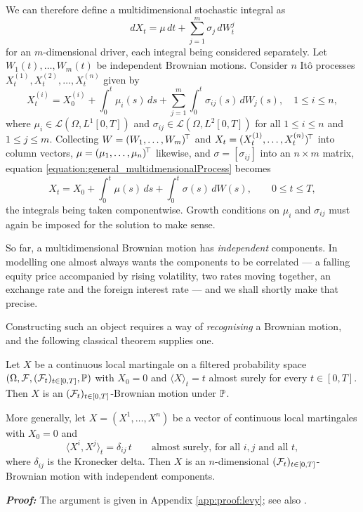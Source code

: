 We can therefore define a multidimensional stochastic integral as
\begin{equation}
    dX_t = \mu \, dt + \sum_{j=1}^{m} \sigma_j \, dW_t^{j}
\end{equation}
for an $m$-dimensional driver, each integral being considered separately. Let
\(W_1(t),\dots,W_m(t)\) be independent Brownian motions. Consider \(n\) Itô processes \(X_t^{(1)}, X_t^{(2)}, \ldots, X_t^{(n)}\) given by
\begin{equation}\label{equation:general_multidmensionalProcess}
X_t^{(i)} = X_0^{(i)} +  \int_0^t \mu_i(s) \, ds +\sum_{j=1}^m \int_0^t \sigma_{ij}(s) \, dW_j(s)  , \quad 1 \leq i \leq n,
\end{equation}
where \(\mu_{i} \in \mathcal{L}(\Omega, L^1[0,T])\) and \(\sigma_{ij} \in \mathcal{L}(\Omega, L^2[0,T])\) for all \(1 \leq i \leq n\) and \(1 \leq j \leq m\). Collecting $W = (W_1,\dots,W_m)^{\!\top}$ and
$X_t = (X^{(1)}_t,\dots,X^{(n)}_t)^{\!\top}$ into column vectors, $\mu = (\mu_1,\dots,\mu_n)^{\!\top}$
likewise, and $\sigma = [\sigma_{ij}]$ into an $n\times m$ matrix, equation
\eqref{equation:general_multidmensionalProcess} becomes
\[
X_t = X_0 + \int_0^t \mu(s)\,ds + \int_0^t \sigma(s)\,dW(s), \qquad 0 \leq t \leq T,
\]
the integrals being taken componentwise. Growth conditions on $\mu_i$ and $\sigma_{ij}$ must again be
imposed for the solution to make sense.

So far, a multidimensional Brownian motion has \emph{independent} components. In modelling one almost always wants the components to be
correlated --- a falling equity price accompanied by rising volatility, two rates moving together,
an exchange rate and the foreign interest rate --- and we shall shortly make that precise.

Constructing such an object requires a way of \emph{recognising} a Brownian motion, and the
following classical theorem supplies one. 

\begin{theorem}\label{thm:levycharacterisation}
    Let $X$ be a continuous local martingale on a filtered probability space $(\Omega,\mathcal{F},(\mathcal{F}_t)_{t\in[0,T]},\mathbb{P})$ with $X_0 = 0$ and $\langle X \rangle_t = t$ almost surely for every $t \in [0,T]$. Then $X$ is an $(\mathcal{F}_t)_{t\in[0,T]}$-Brownian motion under $\mathbb{P}$.

    More generally, let $X = (X^1,\dots,X^n)$ be a vector of continuous local martingales with $X_0 = 0$ and
    \[
    \langle X^i, X^j \rangle_t = \delta_{ij}\,t \qquad \text{almost surely, for all } i,j \text{ and all } t,
    \]
    where $\delta_{ij}$ is the Kronecker delta. Then $X$ is an $n$-dimensional $(\mathcal{F}_t)_{t\in[0,T]}$-Brownian motion with independent components.
\end{theorem}
\textbf{\textit{Proof:}} The argument is given in Appendix \ref{app:proof:levy}; see also \cite[Thm.\ 8.4.2]{kuo2006}. \qedfilledtext

